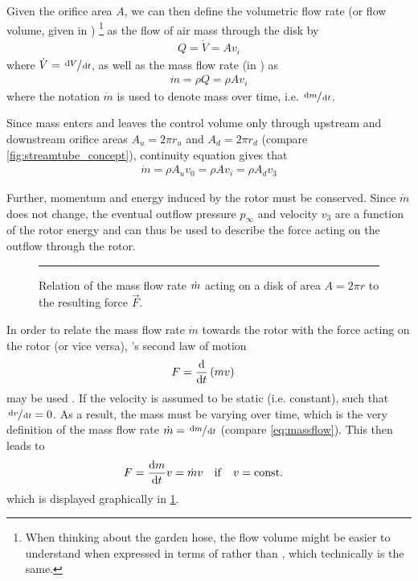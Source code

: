 Given the orifice area $A$, we can then define the volumetric flow rate %
(or flow volume, given in \withunit{\cubic\metre\per\second})%
\footnote{When
thinking about the garden hose, the flow volume might be easier to understand when expressed in terms of  rather than , which technically is the same.}
as the flow of air mass through the disk by
%
\begin{align}
Q = \dot{V} = A v_i \label{eq:flowvolume}
\end{align}
%
where $\dot{V} = \sfrac{\mathop{}\!\mathrm{d} V}{\mathop{}\!\mathrm{d} t}$, as well as the mass flow rate (in \withunit{\kilo\gram\per\second}) as
%
\begin{align}
\dot{m} = \rho Q = \rho A v_i \label{eq:massflow}
\end{align}
%
where the notation $\dot{m}$ is used to denote mass over time, i.e. $\sfrac{\mathop{}\!\mathrm{d} m}{\mathop{}\!\mathrm{d} t}$. %

Since mass enters and leaves the control volume only through upstream and downstream orifice areas $A_u = 2 \pi r_u$ and $A_d = 2 \pi r_d$ (compare \cref{fig:streamtube_concept}), continuity equation gives that 
%
\begin{align}
\dot{m} = \rho A_u v_0 = \rho A v_i = \rho A_d v_3 \label{eq:massflow_continuity}
\end{align}

Further, momentum and energy induced by the rotor must be conserved. 
Since $\dot{m}$ does not change, the eventual outflow pressure $p_\infty$ and velocity $v_3$ are a function of the rotor energy and can thus be used
to describe the force acting on the outflow through the rotor.

\begin{figure}
	\centering
	

	\rule{35em}{0.5pt}
	\caption[Mass flow rate and force]
			{Relation of the mass flow rate $\dot{m}$ acting on a disk of area $A = 2\pi r$ to the resulting force $\vec{F}$.}
	\label{fig:mass_flow_force}
\end{figure}

In order to relate the mass flow rate $\dot{m}$ towards the rotor with the force acting on the rotor (or vice versa), 's second law of motion
%
\begin{align}
F &= \frac{\mathop{}\!\mathrm{d}}{\mathop{}\!\mathrm{d} t} \left( m v \right) \label{eq:newtons_2nd}
\end{align}
%
may be used \cite{book:siekmann2008}.
If the velocity is assumed to be static (i.e. constant), such that $\sfrac{\mathop{}\!\mathrm{d} v}{\mathop{}\!\mathrm{d} t} = 0$. 
As a result, the mass must be varying over time, which is the very definition of the mass flow rate $\dot{m} = \sfrac{\mathop{}\!\mathrm{d} m}{\mathop{}\!\mathrm{d} t}$ (compare \cref{eq:massflow}). 
This then leads to
%
\begin{align}
F &= \frac{\mathop{}\!\mathrm{d} m}{\mathop{}\!\mathrm{d} t} v = \dot{m} v \quad \mathrm{if} \quad v = \mathrm{const.} \label{eq:newtons_2nd_mdot}
\end{align}
%
which is displayed graphically in \cref{fig:mass_flow_force}.

